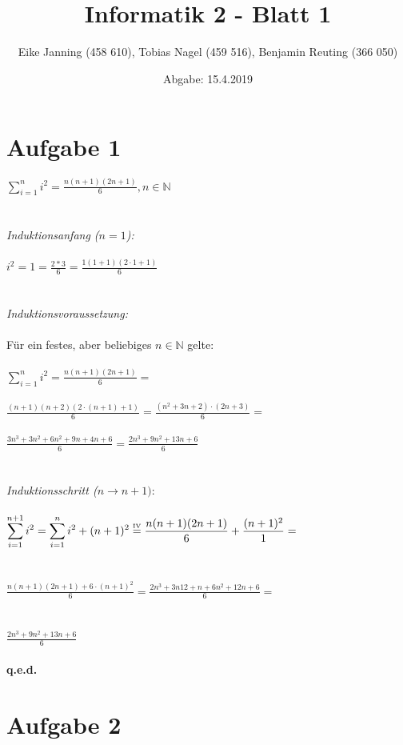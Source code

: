 \documentclass[11pt]{article}
\title{Informatik 2 - Blatt 1}
\author{Eike Janning (458 610), Tobias Nagel (459 516), Benjamin Reuting (366 050)}
\date{Abgabe: 15.4.2019}
\begin{document}
\maketitle

\section*{Aufgabe 1}

$\displaystyle\sum_{i=1}^{n} i^2 = \frac{n(n+1)(2n+1)}{6}, n\in\mathbb{N}$
\\\\\\
\textit{Induktionsanfang ($n=1$):}\\\\
$i^2 = 1 = \frac{2*3}{6} = \frac{1(1+1)(2\cdot1+1)}{6}$
\\\\\\
\textit{Induktionsvoraussetzung:}\\\\
Für ein festes, aber beliebiges $n\in\mathbb{N}$ gelte:\\\\
$\displaystyle\sum_{i=1}^{n} i^2 = \frac{n(n+1)(2n+1)}{6} = $\\\\
$\displaystyle\frac{(n+1)(n+2)(2 \cdot (n+1)+1)}{6} = \frac{(n^2+3n+2) \cdot (2n+3)}{6} = $\\\\
$\displaystyle\frac{3n^3+3n^2+6n^2+9n+4n+6}{6} = \frac{2n^3+9n^2+13n+6}{6}$
\\\\\\
\textit{Induktionsschritt ($n \to n+1):$}\\\\
$\displaystyle\sum_{i=1}^{n+1} i^2 = \displaystyle\sum_{i=1}^{n} i^2 + (n+1)^2 \overset{\text{\tiny{IV}}}{=} \frac{n(n+1)(2n+1)}{6} + \frac{(n+1)^2}{1} = $\\\\\\
$\displaystyle\frac{n(n+1)(2n+1) + 6 \cdot (n+1)^2}{6} = \frac{2n^3+3n12+n+6n^2+12n+6}{6} = $\\\\\\
$\displaystyle\frac{2n^3+9n^2+13n+6}{6}$\\\\
\textbf{q.e.d.}

\pagebreak

\section*{Aufgabe 2}
\end{document}
